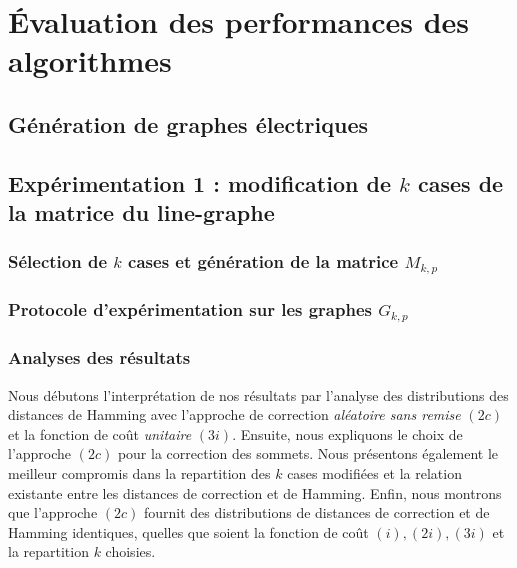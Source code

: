 
\chapter{\'Evaluation des performances des algorithmes}
\label{chapitreEvaluation}



\section{G\'en\'eration de graphes \'electriques}
	\label{generationGraphesElectriques}
	

\section{Exp\'erimentation 1 : modification de $k$ cases  de la matrice du line-graphe}
	\label{experimentation1}
	\subsection{S\'election de $k$ cases et g\'en\'eration de la matrice $M_{k,p}$ }
		
	\subsection{Protocole d'exp\'erimentation sur les graphes $G_{k,p}$}
		
	\subsection{Analyses des r\'esultats }

	Nous d\'ebutons l'interpr\'etation de nos r\'esultats par l'analyse des distributions des distances de Hamming avec l'approche de correction {\em al\'eatoire sans remise} $(2c)$ et  la fonction de co\^ut {\em unitaire} $(3i)$.
	Ensuite, nous expliquons le choix de l'approche $(2c)$  pour la correction des sommets. 
	Nous pr\'esentons \'egalement le meilleur compromis dans la repartition des $k$ cases modifi\'ees et la relation existante entre les distances de correction et de Hamming.
	Enfin,  nous montrons que l'approche $(2c)$ fournit des distributions de distances de correction et de Hamming identiques, quelles que soient la fonction de co\^ut $(i), (2i), (3i)$ et la repartition $k$ choisies.
